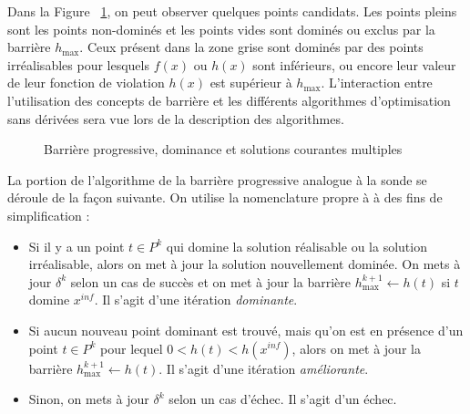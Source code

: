 Dans la Figure ~\ref{fig:barrier}, on peut observer quelques points candidats. Les points pleins sont les points non-dominés et les points vides sont dominés ou exclus par la barrière $h_{\max}$. Ceux présent dans la zone grise sont dominés par des points irréalisables pour lesquels $f(x)$ ou $h(x)$ sont inférieurs,  ou encore leur valeur de leur fonction de violation $h(x)$ est supérieur à $h_{\max}$. L'interaction entre l'utilisation des concepts de barrière et les différents algorithmes d'optimisation sans dérivées sera vue lors de la description des algorithmes.
\begin{figure}[h]
	\begin{center}
	\end{center}
\caption{Barrière progressive, dominance et solutions courantes multiples} \label{fig:barrier}
	\end{figure}
La portion de l'algorithme de la barrière progressive analogue à la sonde se déroule de la façon suivante. On utilise la nomenclature propre à \CS à des fins de simplification  :
\begin{itemize}
	\item Si il y a un point $t \in P^k$ qui domine la solution réalisable ou la solution irréalisable, alors on met à jour la solution nouvellement dominée. On mets à jour $\delta^k$ selon un cas de succès et on met à jour la barrière $h^{k+1}_{\max} \leftarrow h(t)$ si $t$ domine $x^{inf}$. Il s'agit d'une itération \emph{dominante}.
	\item Si aucun nouveau point dominant est trouvé, mais qu'on est en présence d'un point $t \in P^k$ pour lequel $0 < h(t) < h(x^{inf})$, alors on met à jour la barrière $h^{k+1}_{\max} \leftarrow h(t)$. Il s'agit d'une itération \emph{améliorante}.
	\item Sinon, on mets à jour $\delta^k$ selon un cas d'échec. Il s'agit d'un échec.
\end{itemize}
